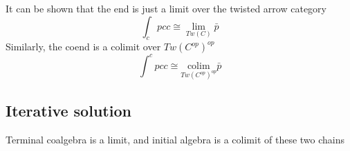 \documentclass[11pt]{amsart}
\begin{document}
It can be shown that the end is just a limit over the twisted arrow category
\[\int_c p c c \cong \lim_{Tw(C)} \bar p\]
Similarly, the coend is a colimit over $Tw(C^{op} )^{op}$
\[\int^c p c c \cong \underset {Tw(C^{op})^{op}}  { \mbox{colim}} \bar p\]

\subsection{Iterative solution}
Terminal coalgebra is a limit, and initial algebra is a colimit of these two chains
\begin{figure}[H]
\centering
{}
\end{figure}
\end{document}

